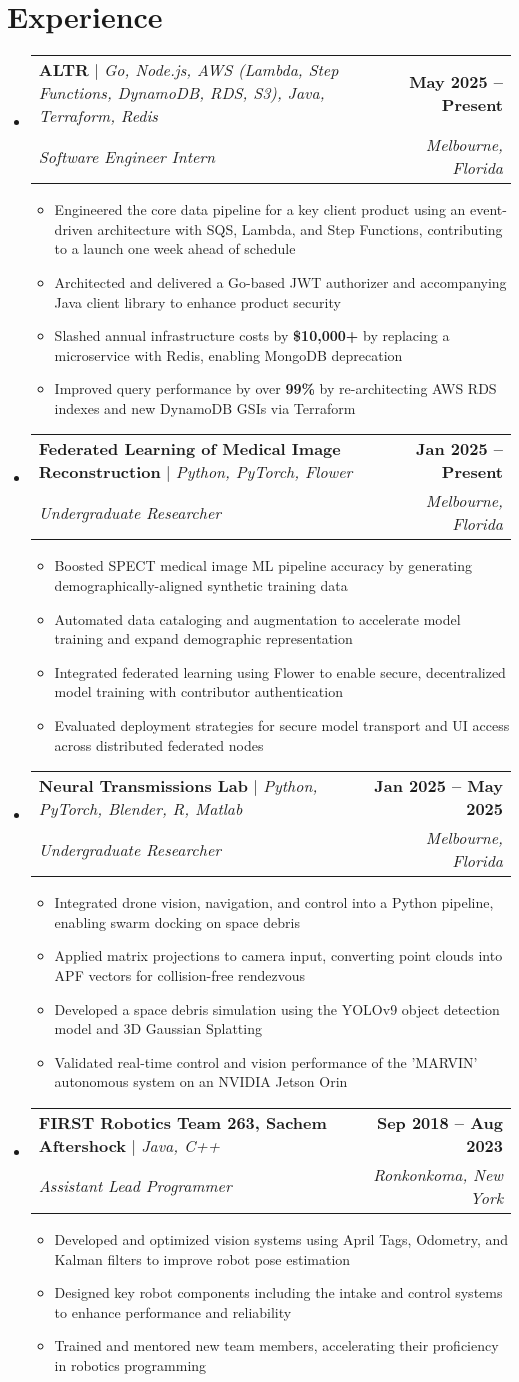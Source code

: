 \documentclass[letterpaper,11pt]{article}
\makeatletter
\newcommand{\resumeItem}[1]{
  \item\small{
    {#1 \vspace{-2pt}}
  }
}
\newcommand{\resumeSubheading}[4]{
  \vspace{-2pt}\item
    \begin{tabular*}{1.0\textwidth}[t]{l@{\extracolsep{\fill}}r}
      \small#1 & \textbf{\small #2} \\
      \textit{\small#3} & \textit{\small #4} \\
    \end{tabular*}\vspace{-9pt}
}
\newcommand{\resumeSubHeadingListStart}{\begin{itemize}[leftmargin=0.0in, label={}]}
\newcommand{\resumeSubHeadingListEnd}{\end{itemize}}
\newcommand{\resumeItemListStart}{\begin{itemize}}
\newcommand{\resumeItemListEnd}{\end{itemize}\vspace{-5pt}}
\makeatother
\begin{document}
\section{Experience}
  \resumeSubHeadingListStart
    \vspace{0pt}
    \resumeSubheading
    {\textbf{ALTR} $|$ \emph{Go, Node.js, AWS (Lambda, Step Functions, DynamoDB, RDS, S3), Java, Terraform, Redis}}{May 2025 -- Present}
    {Software Engineer Intern}{Melbourne, Florida}
    \resumeItemListStart
      \resumeItem{Engineered the core data pipeline for a key client product using an event-driven architecture with SQS, Lambda, and Step Functions, contributing to a launch one week ahead of schedule}
      \resumeItem{Architected and delivered a Go-based JWT authorizer and accompanying Java client library to enhance product security}
      \resumeItem{Slashed annual infrastructure costs by \textbf{\$10,000+} by replacing a microservice with Redis, enabling MongoDB deprecation}
      \resumeItem{Improved query performance by over \textbf{99\%} by re-architecting AWS RDS indexes and new DynamoDB GSIs via Terraform}
    \resumeItemListEnd
  \resumeSubheading
    {\textbf{Federated Learning of Medical Image Reconstruction} $|$ \emph{Python, PyTorch, Flower}}{Jan 2025 -- Present}
    {Undergraduate Researcher}{Melbourne, Florida}
    \resumeItemListStart
      \resumeItem{Boosted SPECT medical image ML pipeline accuracy by generating demographically-aligned synthetic training data}
      \resumeItem{Automated data cataloging and augmentation to accelerate model training and expand demographic representation}
      \resumeItem{Integrated federated learning using Flower to enable secure, decentralized model training with contributor authentication}
      \resumeItem{Evaluated deployment strategies for secure model transport and UI access across distributed federated nodes}
    \resumeItemListEnd
  \resumeSubheading
    {\textbf{Neural Transmissions Lab} $|$ \emph{Python, PyTorch, Blender, R, Matlab}}{Jan 2025 -- May 2025}      
    {Undergraduate Researcher}{Melbourne, Florida}
    \resumeItemListStart
      \resumeItem{Integrated drone vision, navigation, and control into a Python pipeline, enabling swarm docking on space debris}
      \resumeItem{Applied matrix projections to camera input, converting point clouds into APF vectors for collision-free rendezvous}
      \resumeItem{Developed a space debris simulation using the YOLOv9 object detection model and 3D Gaussian Splatting}
      \resumeItem{Validated real-time control and vision performance of the 'MARVIN' autonomous system on an NVIDIA Jetson Orin}
    \resumeItemListEnd
  \resumeSubheading
    {\textbf{FIRST Robotics Team 263, Sachem Aftershock} $|$ \emph{Java, C++}}{Sep 2018 -- Aug 2023}
    {Assistant Lead Programmer}{Ronkonkoma, New York}
    \resumeItemListStart
      \resumeItem{Developed and optimized vision systems using April Tags, Odometry, and Kalman filters to improve robot pose estimation}
      \resumeItem{Designed key robot components including the intake and control systems to enhance performance and reliability}
      \resumeItem{Trained and mentored new team members, accelerating their proficiency in robotics programming}
    \resumeItemListEnd
\resumeSubHeadingListEnd
\end{document}
